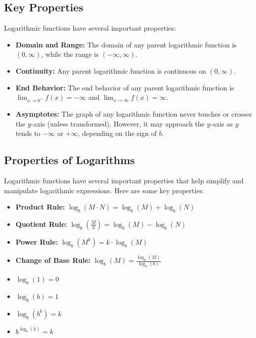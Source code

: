 \documentclass[11pt]{article}
\begin{document}
\subsection{Key Properties}

Logarithmic functions have several important properties:

\begin{itemize}
  \item \textbf{Domain and Range:} The domain of any parent logarithmic function is $(0, \infty)$, while the range is $(-\infty, \infty)$.
  \item \textbf{Continuity:} Any parent logarithmic function is continuous on $(0, \infty)$.
  \item \textbf{End Behavior:} The end behavior of any parent logarithmic function is $\lim_{x \to 0^{+}} f(x) = -\infty$ and $\lim_{x \to \infty} f(x) = \infty$.
  \item \textbf{Asymptotes:} The graph of any logarithmic function never touches or crosses the $y$-axis (unless transformed). However, it may approach the $y$-axis as $y$ tends to $-\infty$ or $+\infty$, depending on the sign of $b$.
\end{itemize}

\subsection{Properties of Logarithms}

Logarithmic functions have several important properties that help simplify and manipulate logarithmic expressions. Here are some key properties:

\begin{itemize}
    \item \textbf{Product Rule: }$\log_{b}(M\cdot N) = \log_{b}(M) + \log_{b}(N)$
    \item \textbf{Quotient Rule: }$\log_{b}(\frac{M}{N}) = \log_{b}(M) - \log_{b}(N)$
    \item \textbf{Power Rule: }$\log_{b}(M^{k}) = k\cdot \log_{b}(M)$
    \item \textbf{Change of Base Rule: }$\log_{b}(M) = \frac{\log_{a}(M)}{\log_{a}(b)}$
    \item $\log_{b}(1) = 0$
    \item $\log_{b}(b) = 1$
    \item $\log_{b}(b^{k}) = k$
    \item $b^{\log_{b}(k)} = k$
\end{itemize}
\end{document}
